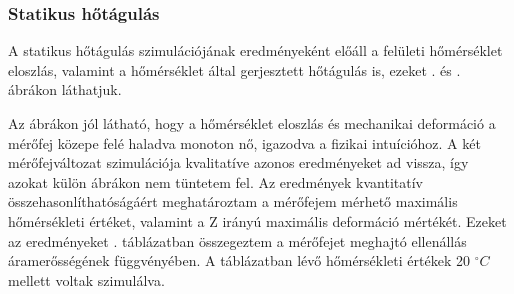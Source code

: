 \subsubsection{Statikus hőtágulás}

A statikus hőtágulás szimulációjának eredményeként előáll a felületi hőmérséklet eloszlás, valamint a hőmérséklet által gerjesztett hőtágulás is, ezeket . és . ábrákon láthatjuk.


Az ábrákon jól látható, hogy a hőmérséklet eloszlás és mechanikai deformáció a mérőfej közepe felé haladva monoton nő, igazodva a fizikai intuícióhoz. A két mérőfejváltozat szimulációja kvalitatíve azonos eredményeket ad vissza, így azokat külön ábrákon nem tüntetem fel. Az eredmények kvantitatív összehasonlíthatóságáért meghatároztam a mérőfejem mérhető maximális hőmérsékleti értéket, valamint a Z irányú maximális deformáció mértékét. Ezeket az eredményeket . táblázatban összegeztem a mérőfejet meghajtó ellenállás áramerősségének függvényében. A táblázatban lévő hőmérsékleti értékek 20 $^\circ C$ mellett voltak szimulálva.

\begin{table}[!ht]
    \centering
    \footnotesize
    \caption{Statikus hőtágulás mértéke különböző áramerősségek mellett}
    \label{tab:DC_expansion}
\end{table}

